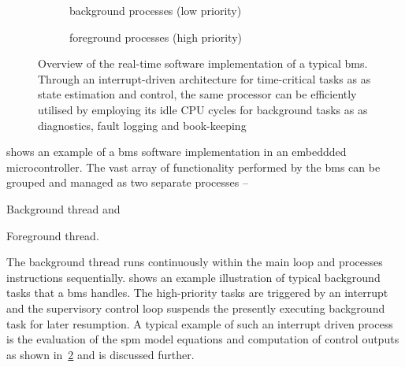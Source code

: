 \begin{figure}[htb]
{\begin{subfigure}[b]{0.50\textwidth}
            \usebox{\algboxA}
            \caption{background processes (low priority)}
            \label{subfig:bgRTprocess}
        \end{subfigure}
        \hfill
        \begin{subfigure}[b]{0.45\textwidth}
            \raisebox{\dimexpr.5\ht\algboxA-.5\ht\algboxB}{%
                \usebox{\algboxB}%
            }
            \caption{foreground processes (high priority)}
            \label{subfig:fgRTprocess}
        \end{subfigure}
    }
    \caption[Overview of the real-time software implementation of a typical
    \gls{bms}]{Overview of the real-time software implementation of a typical
        \gls{bms}. Through an interrupt-driven architecture for time-critical tasks as
        as state estimation and control, the same processor can be
        efficiently utilised by employing its idle CPU cycles for background tasks as
    as diagnostics, fault logging and book-keeping}
    \label{fig:basicRTCsoftwarearch}
\end{figure}

  shows  an  example   of  a  \gls{bms}  software
implementation in an embeddded microcontroller. The vast array of functionality
performed by the \gls{bms} can be grouped and managed as two separate processes --
\begin{enumerate*}[label=\itshape\alph*\upshape)]
    \item Background thread and
    \item Foreground thread.
\end{enumerate*}
The   background   thread  runs   continuously   within   the  main   loop   and
processes instructions sequentially.   shows an example
illustration  of  typical  background  tasks   that  a  \gls{bms}  handles.  The
high-priority tasks  are triggered by  an interrupt and the  supervisory control
loop suspends  the presently executing  background task for later  resumption. A
typical  example of  such  an  interrupt driven  process  is  the evaluation  of
the  \gls{spm} model  equations  and  computation of  control  outputs as  shown
in~\cref{subfig:fgRTprocess} and is discussed further.

